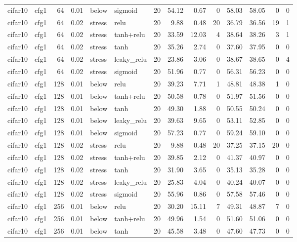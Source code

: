 \begin{table}[htbp]
{\begin{tabular}{@{}llrrllrrrrrrrr@{}}
cifar10 & cfg1 & 64 & 0.01 & below & sigmoid & 20 & 54.12 & 0.67 & 0 & 58.03 & 58.05 & 0 & 0 \\
cifar10 & cfg1 & 64 & 0.02 & stress & relu & 20 & 9.88 & 0.48 & 20 & 36.79 & 36.56 & 19 & 1 \\
cifar10 & cfg1 & 64 & 0.02 & stress & tanh+relu & 20 & 33.59 & 12.03 & 4 & 38.64 & 38.26 & 3 & 1 \\
cifar10 & cfg1 & 64 & 0.02 & stress & tanh & 20 & 35.26 & 2.74 & 0 & 37.60 & 37.95 & 0 & 0 \\
cifar10 & cfg1 & 64 & 0.02 & stress & leaky\_relu & 20 & 23.86 & 3.06 & 0 & 38.67 & 38.65 & 0 & 4 \\
cifar10 & cfg1 & 64 & 0.02 & stress & sigmoid & 20 & 51.96 & 0.77 & 0 & 56.31 & 56.23 & 0 & 0 \\
cifar10 & cfg1 & 128 & 0.01 & below & relu & 20 & 39.23 & 7.71 & 1 & 48.81 & 48.38 & 1 & 0 \\
cifar10 & cfg1 & 128 & 0.01 & below & tanh+relu & 20 & 50.58 & 0.78 & 0 & 51.97 & 51.56 & 0 & 0 \\
cifar10 & cfg1 & 128 & 0.01 & below & tanh & 20 & 49.30 & 1.88 & 0 & 50.55 & 50.24 & 0 & 0 \\
cifar10 & cfg1 & 128 & 0.01 & below & leaky\_relu & 20 & 39.63 & 9.65 & 0 & 53.11 & 52.85 & 0 & 0 \\
cifar10 & cfg1 & 128 & 0.01 & below & sigmoid & 20 & 57.23 & 0.77 & 0 & 59.24 & 59.10 & 0 & 0 \\
cifar10 & cfg1 & 128 & 0.02 & stress & relu & 20 & 9.88 & 0.48 & 20 & 37.25 & 37.15 & 20 & 0 \\
cifar10 & cfg1 & 128 & 0.02 & stress & tanh+relu & 20 & 39.85 & 2.12 & 0 & 41.37 & 40.97 & 0 & 0 \\
cifar10 & cfg1 & 128 & 0.02 & stress & tanh & 20 & 31.90 & 3.65 & 0 & 35.13 & 35.28 & 0 & 0 \\
cifar10 & cfg1 & 128 & 0.02 & stress & leaky\_relu & 20 & 25.83 & 4.04 & 0 & 40.24 & 40.07 & 0 & 0 \\
cifar10 & cfg1 & 128 & 0.02 & stress & sigmoid & 20 & 55.96 & 0.86 & 0 & 57.58 & 57.46 & 0 & 0 \\
cifar10 & cfg1 & 256 & 0.01 & below & relu & 20 & 30.20 & 15.11 & 7 & 49.31 & 48.87 & 7 & 0 \\
cifar10 & cfg1 & 256 & 0.01 & below & tanh+relu & 20 & 49.96 & 1.54 & 0 & 51.60 & 51.06 & 0 & 0 \\
cifar10 & cfg1 & 256 & 0.01 & below & tanh & 20 & 45.58 & 3.48 & 0 & 47.60 & 47.73 & 0 & 0 \\

\end{tabular}}
\end{table}
